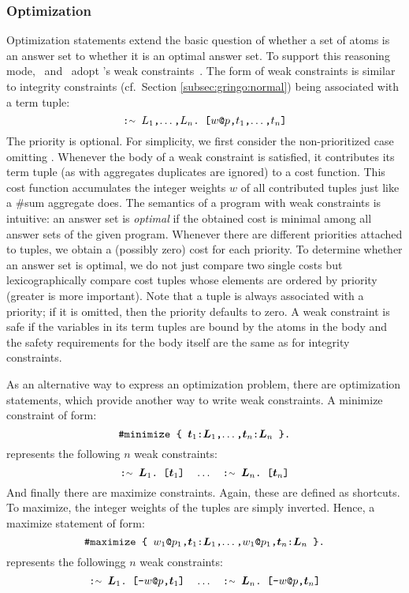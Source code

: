 \subsubsection{Optimization}\label{subsec:gringo:optimize}
Optimization statements extend the basic question of
whether a set of atoms is an answer set to
whether it is an optimal answer set.
To support this reasoning mode, \gringo\ and \clingo\ adopt \dlv's weak constraints~\cite{bflnrp00}.
The form of weak constraints is similar to integrity constraints (cf.~Section \ref{subsec:gringo:normal})
being associated with a term tuple:
%
\[
    \code{:{\raise.17ex\hbox{$\scriptstyle\sim$}}~$L_1$,$\dots$,$L_n$.~[$w$@$p$,$t_1$,$\dots$,$t_n$]}
\]
The priority  is optional.
For simplicity, we first consider the non-prioritized case omitting .
Whenever the body of a weak constraint is satisfied,
it contributes its term tuple (as with aggregates duplicates are ignored) to a cost function.
This cost function accumulates the integer weights $w$ of all contributed tuples just like a \#sum aggregate does.
The semantics of a program with weak constraints is intuitive:
an answer set is \emph{optimal}
if the obtained cost is minimal among all answer sets of the given program.
Whenever there are different priorities attached to tuples,
we obtain a (possibly zero) cost for each priority.
To determine whether an answer set is optimal,
we do not just compare two single costs
but lexicographically compare cost tuples whose elements are ordered by priority (greater is more important).
Note that a tuple is always associated with a priority;
if it is omitted, then the priority defaults to zero.
A weak constraint is safe if the variables in its term tuples are bound by the atoms in the body
and the safety requirements for the body itself are the same as for integrity constraints.

As an alternative way to express an optimization problem,
there are optimization statements,
which provide another way to write weak constraints.
A minimize constraint of form:
\[
    \texttt{\#minimize \{ $\boldsymbol{t}_1$:$\boldsymbol{L}_1$,$\dots$,$\boldsymbol{t}_n$:$\boldsymbol{L}_n$ \}.}
\]
represents the following $n$ weak constraints:
\[
    \code{:{\raise.17ex\hbox{$\scriptstyle\sim$}}~$\boldsymbol{L}_1$.~[$\boldsymbol{t}_1$]}
    \quad \dots \quad
    \code{:{\raise.17ex\hbox{$\scriptstyle\sim$}}~$\boldsymbol{L}_n$.~[$\boldsymbol{t}_n$]}
\]
And finally there are maximize constraints.
Again, these are defined as shortcuts.
To maximize, the integer weights of the tuples are simply inverted.
Hence, a maximize statement of form:
\[
    \texttt{\#maximize \{ $w_1$@$p_1$,$\boldsymbol{t}_1$:$\boldsymbol{L}_1$,$\dots$,$w_1$@$p_1$,$\boldsymbol{t}_n$:$\boldsymbol{L}_n$ \}.}
\]
represents the followingg $n$ weak constraints:
\[
    \code{:{\raise.17ex\hbox{$\scriptstyle\sim$}}~$\boldsymbol{L}_1$.~[-$w$@$p$,$\boldsymbol{t}_1$]}
    \quad \dots \quad
    \code{:{\raise.17ex\hbox{$\scriptstyle\sim$}}~$\boldsymbol{L}_n$.~[-$w$@$p$,$\boldsymbol{t}_n$]}
\]

